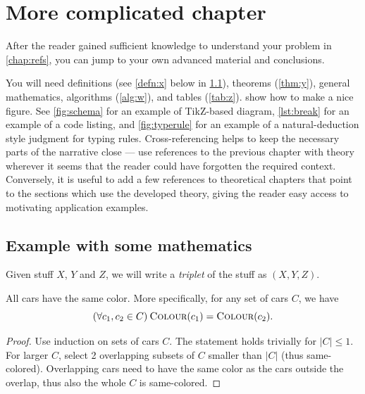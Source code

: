 \chapter{More complicated chapter}\label{chap:math}

After the reader gained sufficient knowledge to understand your problem in \cref{chap:refs}, you can jump to your own advanced material and conclusions.

You will need definitions (see \cref{defn:x} below in \cref{sec:demo}), theorems (\cref{thm:y}), general mathematics, algorithms (\cref{alg:w}), and tables (\cref{tab:z}).  show how to make a nice figure. See \cref{fig:schema} for an example of TikZ-based diagram, \cref{lst:break} for an example of a code listing, and \cref{fig:typerule} for an example of a natural-deduction style judgment for typing rules. Cross-referencing helps to keep the necessary parts of the narrative close --- use references to the previous chapter with theory wherever it seems that the reader could have forgotten the required context. Conversely, it is useful to add a few references to theoretical chapters that point to the sections which use the developed theory, giving the reader easy access to motivating application examples.

\section{Example with some mathematics}
\label{sec:demo}

\begin{definition}[Triplet]\label{defn:x}
Given stuff $X$, $Y$ and $Z$, we will write a \emph{triplet} of the stuff as $(X,Y,Z)$.
\end{definition}

\newcommand{\Col}{\textsc{Colour}}

\begin{theorem}\label{thm:y}
All cars have the same color. More specifically, for any set of cars $C$, we have
$$(\forall c_1, c_2 \in C)\:\Col(c_1) = \Col(c_2).$$
\end{theorem}

\begin{proof}
Use induction on sets of cars $C$. The statement holds trivially for $|C|\leq1$. For larger $C$, select 2 overlapping subsets of $C$ smaller than $|C|$ (thus same-colored). Overlapping cars need to have the same color as the cars outside the overlap, thus also the whole $C$ is same-colored.
\end{proof}

